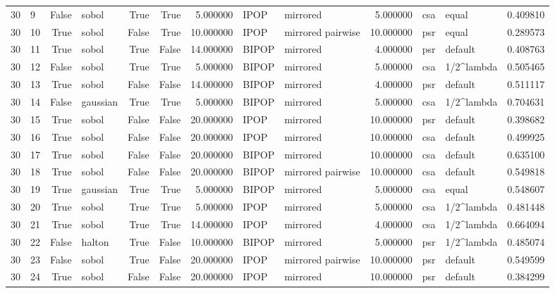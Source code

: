 \begin{tabular}{rlrlrrrllrllr}
30 & 9 & False & sobol & True & True & 5.000000 & IPOP & mirrored & 5.000000 & csa & equal & 0.409810 \\
30 & 10 & True & sobol & False & True & 10.000000 & IPOP & mirrored pairwise & 10.000000 & psr & equal & 0.289573 \\
30 & 11 & True & sobol & True & False & 14.000000 & BIPOP & mirrored & 4.000000 & psr & default & 0.408763 \\
30 & 12 & False & sobol & True & True & 5.000000 & BIPOP & mirrored & 5.000000 & csa & 1/2^lambda & 0.505465 \\
30 & 13 & True & sobol & False & False & 14.000000 & BIPOP & mirrored & 4.000000 & psr & default & 0.511117 \\
30 & 14 & False & gaussian & True & True & 5.000000 & BIPOP & mirrored & 5.000000 & csa & 1/2^lambda & 0.704631 \\
30 & 15 & True & sobol & False & False & 20.000000 & IPOP & mirrored & 10.000000 & psr & default & 0.398682 \\
30 & 16 & True & sobol & False & False & 20.000000 & IPOP & mirrored & 10.000000 & csa & default & 0.499925 \\
30 & 17 & True & sobol & False & False & 20.000000 & BIPOP & mirrored & 10.000000 & csa & default & 0.635100 \\
30 & 18 & True & sobol & False & False & 20.000000 & BIPOP & mirrored pairwise & 10.000000 & csa & default & 0.549818 \\
30 & 19 & True & gaussian & True & True & 5.000000 & BIPOP & mirrored & 5.000000 & csa & equal & 0.548607 \\
30 & 20 & True & sobol & True & True & 5.000000 & IPOP & mirrored & 5.000000 & csa & 1/2^lambda & 0.481448 \\
30 & 21 & True & sobol & True & True & 14.000000 & IPOP & mirrored & 4.000000 & csa & 1/2^lambda & 0.664094 \\
30 & 22 & False & halton & True & False & 10.000000 & BIPOP & mirrored & 5.000000 & psr & 1/2^lambda & 0.485074 \\
30 & 23 & False & sobol & True & False & 20.000000 & IPOP & mirrored pairwise & 10.000000 & psr & default & 0.549599 \\
30 & 24 & True & sobol & False & False & 20.000000 & IPOP & mirrored & 10.000000 & psr & default & 0.384299 \\
\bottomrule
\end{tabular}
